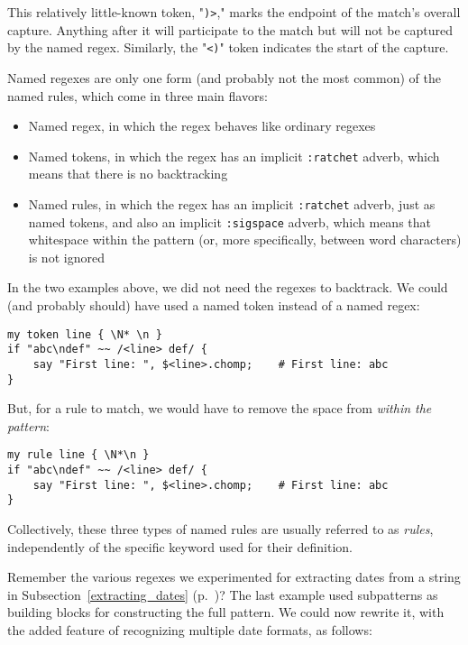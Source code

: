 This relatively little-known token, "\verb')>'," marks 
the endpoint of the match's overall capture. Anything 
after it will participate to the match but will not 
be captured by the named regex. Similarly, the "\verb'<)'" 
token indicates the start of the capture.

Named regexes are only one form (and probably not the 
most common) of the named rules, which 
come in three main flavors:
\begin{itemize}
\item Named regex, in which the regex behaves like ordinary 
regexes
\item Named tokens, in which the regex has an implicit 
{\tt :ratchet} adverb, which means that there is no 
backtracking
\item Named rules, in which the regex has an implicit 
{\tt :ratchet} adverb, just as named tokens, and also 
an implicit {\tt :sigspace} adverb, which means that 
whitespace within the pattern (or, more specifically, 
between word characters) is not ignored
\end{itemize}

In the two examples above, we did not need the regexes 
to backtrack. We could (and probably should) have used 
a named token instead of a named regex:

\begin{verbatim}
my token line { \N* \n }
if "abc\ndef" ~~ /<line> def/ {
    say "First line: ", $<line>.chomp;    # First line: abc
}
\end{verbatim} 

But, for a rule to match, we would have to remove the 
space from \emph{within the pattern}:

\begin{verbatim}
my rule line { \N*\n }
if "abc\ndef" ~~ /<line> def/ {
    say "First line: ", $<line>.chomp;    # First line: abc
}
\end{verbatim} 

Collectively, these three types of named rules are usually 
referred to as \emph{rules}, independently of the specific 
keyword used for their definition.

Remember the various regexes we experimented for 
extracting dates from a string in 
Subsection~\ref{extracting_dates} 
(p.~\pageref{extracting_dates})? The last example 
used subpatterns as building blocks for constructing 
the full pattern. We could now rewrite it, with the 
added feature of recognizing multiple date formats, as 
follows:

